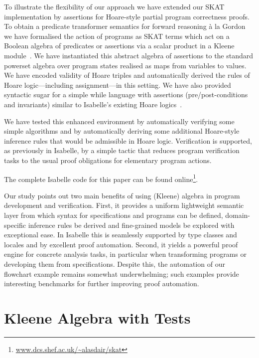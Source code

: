 \documentclass{llncs}
\begin{document}
To illustrate the flexibility of our approach we have extended our
SKAT implementation by assertions for Hoare-style partial program
correctness proofs. To obtain a predicate transformer semantics for
forward reasoning \`a la Gordon~\cite{CollavizzaGordon} we have
formalised the action of programs as SKAT terms which act on a Boolean
algebra of predicates or assertions via a scalar product in a Kleene
module~\cite{EhmMoellerStruth,Leiss}. We have instantiated this
abstract algebra of assertions to the standard powerset algebra over
program states realised as maps from variables to values. We have
encoded validity of Hoare triples and automatically derived the rules
of Hoare logic---including assignment---in this setting. We have also
provided syntactic sugar for a simple while language with assertions
(pre/post-conditions and invariants) similar to Isabelle's existing
Hoare logics~\cite{Nipkow98,Schirmer}.

We have tested this enhanced environment by automatically verifying
some simple algorithms and by automatically deriving some additional
Hoare-style inference rules that would be admissible in Hoare
logic. Verification is supported, as previously in Isabelle, by a
simple tactic that reduces program verification tasks to the usual
proof obligations for elementary program actions.

The complete Isabelle code for this paper can be found online\footnote{\url{www.dcs.shef.ac.uk/~alasdair/skat}}.

Our study points out two main benefits of using (Kleene) algebra in
program development and verification. First, it provides a uniform
lightweight semantic layer from which syntax for specifications and
programs can be defined, domain-specific inference rules be derived
and fine-grained models be explored with exceptional ease. In Isabelle
this is seamlessly supported by type classes and locales and by
excellent proof automation. Second, it yields a powerful proof engine
for concrete analysis tasks, in particular when transforming programs
or developing them from specifications. Despite this, the automation
of our flowchart example remains somewhat underwhelming; such examples
provide interesting benchmarks for further improving proof automation.



\section{Kleene Algebra with Tests}
\label{sec:alg}
\end{document}
